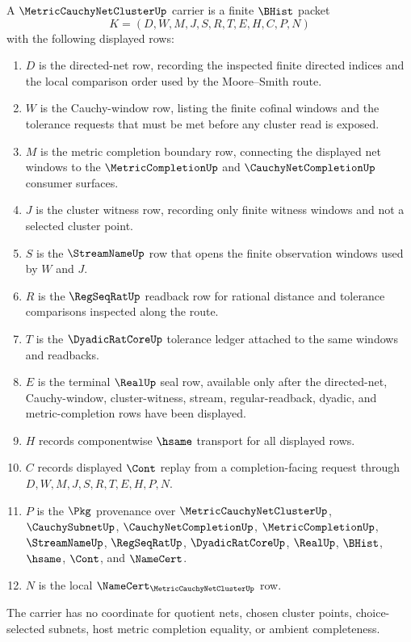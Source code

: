 \begin{definition}
\label{def:metric-cauchy-net-cluster-carrier}
A $\MetricCauchyNetClusterUp$ carrier is a finite $\BHist$ packet
$$
K=(D,W,M,J,S,R,T,E,H,C,P,N)
$$
with the following displayed rows:
\begin{enumerate}
\item $D$ is the directed-net row, recording the inspected finite directed indices and the local comparison order used by the Moore--Smith route.
\item $W$ is the Cauchy-window row, listing the finite cofinal windows and the tolerance requests that must be met before any cluster read is exposed.
\item $M$ is the metric completion boundary row, connecting the displayed net windows to the $\MetricCompletionUp$ and $\CauchyNetCompletionUp$ consumer surfaces.
\item $J$ is the cluster witness row, recording only finite witness windows and not a selected cluster point.
\item $S$ is the $\StreamNameUp$ row that opens the finite observation windows used by $W$ and $J$.
\item $R$ is the $\RegSeqRatUp$ readback row for rational distance and tolerance comparisons inspected along the route.
\item $T$ is the $\DyadicRatCoreUp$ tolerance ledger attached to the same windows and readbacks.
\item $E$ is the terminal $\RealUp$ seal row, available only after the directed-net, Cauchy-window, cluster-witness, stream, regular-readback, dyadic, and metric-completion rows have been displayed.
\item $H$ records componentwise $\hsame$ transport for all displayed rows.
\item $C$ records displayed $\Cont$ replay from a completion-facing request through $D,W,M,J,S,R,T,E,H,P,N$.
\item $P$ is the $\Pkg$ provenance over $\MetricCauchyNetClusterUp$, $\CauchySubnetUp$, $\CauchyNetCompletionUp$, $\MetricCompletionUp$, $\StreamNameUp$, $\RegSeqRatUp$, $\DyadicRatCoreUp$, $\RealUp$, $\BHist$, $\hsame$, $\Cont$, and $\NameCert$.
\item $N$ is the local $\NameCert_{\MetricCauchyNetClusterUp}$ row.
\end{enumerate}
The carrier has no coordinate for quotient nets, chosen cluster points, choice-selected subnets, host metric completion equality, or ambient completeness.
\end{definition}

